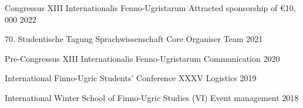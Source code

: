 
\begin{cvhonors}
    \cvhonor
    {Congressus XIII Internationalis Fenno-Ugristarum} %
    {Attracted sponsorship of €10, 000} %
    {} %
    {2022} %

    \cvhonor
    {70. Studentische Tagung Sprachwissenschaft} %
    {Core Organiser Team} %
    {} %
    {2021} %

    \cvhonor
    {Pre-Congressus XIII Internationalis Fenno-Ugristarum} %
    {Communication} %
    {} %
    {2020} %

    \cvhonor
    {International Finno-Ugric Students' Conference XXXV} %
    {Logistics} %
    {} %
    {2019} %

    \cvhonor
    {International Winter School of Finno-Ugric Studies (VI)} %
    {Event management} %
    {} %
    {2018} %
\end{cvhonors}